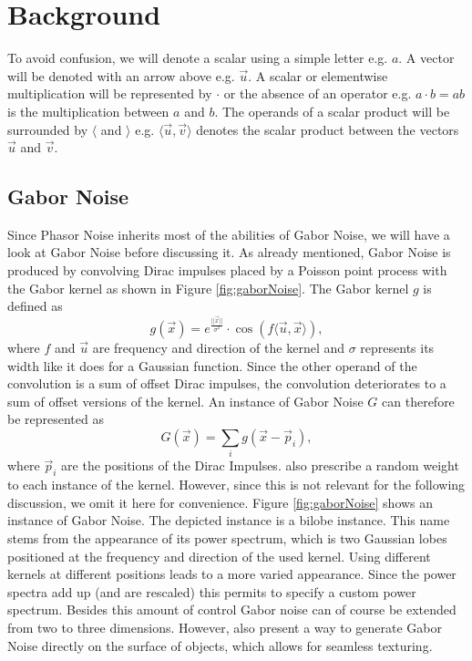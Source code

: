 \documentclass{utue} %
\begin{document}
\section{Background}
To avoid confusion, we will denote a scalar using a simple letter e.g. $a$. A vector will be denoted with an arrow above e.g. $\vec{u}$. A scalar or elementwise multiplication will be represented by $\cdot$ or the absence of an operator e.g. $a\cdot b=ab$ is the multiplication between $a$ and $b$. The operands of a scalar product will be surrounded by $\langle$ and $\rangle$ e.g. $\langle\vec{u},\vec{v}\rangle$ denotes the scalar product between the vectors $\vec{u}$ and $\vec{v}$.

\subsection{Gabor Noise}
Since Phasor Noise inherits most of the abilities of Gabor Noise, we will have a look at Gabor Noise before discussing it. As already mentioned, Gabor Noise is produced by convolving Dirac impulses placed by a Poisson point process with the Gabor kernel as shown in Figure \ref{fig:gaborNoise}. The Gabor kernel $g$ is defined as
$$
g(\vec{x}) = e^{\frac{||\vec{x}||}{\sigma^2}}\cdot \cos{(f\langle\vec{u},\vec{x}\rangle)},
$$
where $f$ and $\vec{u}$ are frequency and direction of the kernel and $\sigma$ represents its width like it does for a Gaussian function. Since the other operand of the convolution is a sum of offset Dirac impulses, the convolution deteriorates to a sum of offset versions of the kernel. An instance of Gabor Noise $G$ can therefore be represented as
$$
G(\vec{x}) = \sum_ig(\vec{x}-\vec{p}_i),
$$
where $\vec{p}_i$ are the positions of the Dirac Impulses. \citeauthor{gaborNoise} also prescribe a random weight to each instance of the kernel. However, since this is not relevant for the following discussion, we omit it here for convenience. Figure \ref{fig:gaborNoise} shows an instance of Gabor Noise. The depicted instance is a bilobe instance. This name stems from the appearance of its power spectrum, which is two Gaussian lobes positioned at the frequency and direction of the used kernel. Using different kernels at different positions leads to a more varied appearance. Since the power spectra add up (and are rescaled) this permits to specify a custom power spectrum. Besides this amount of control Gabor noise can of course be extended from two to three dimensions. However, \citeauthor{gaborNoise} also present a way to generate Gabor Noise directly on the surface of objects, which allows for seamless texturing.
\end{document}
